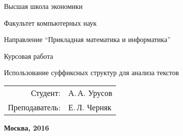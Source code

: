 \begin{titlepage}
\begin{center} %

\bfseries

	{\Large Высшая школа экономики
	} %

\vspace{48pt}


	{\large Факультет компьютерных наук
	}


\vspace{36pt}

	{\large Направление \enquote{Прикладная математика и информатика}
	
	} %

\vspace{48pt}

	 Курсовая работа

\vspace{12pt}

	{\Large Использование суффиксных структур для анализа текстов
	}

\end{center} %

\vspace{60pt}

	\begin{flushright}
		\begin{tabular}{rl}
			Студент: & А.\,А. Урусов \\
			Преподаватель: & Е.\,Л. Черняк \\
		\end{tabular}
	\end{flushright}

\vfill

	\begin{center} %
		\bfseries
		Москва, 2016
	\end{center}
	
\end{titlepage} 

